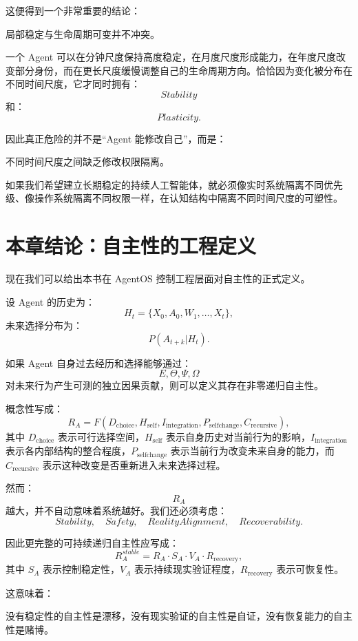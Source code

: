 这便得到一个非常重要的结论：

\begin{conclusion}
局部稳定与生命周期可变并不冲突。
\end{conclusion}

一个 Agent 可以在分钟尺度保持高度稳定，在月度尺度形成能力，在年度尺度改变部分身份，而在更长尺度缓慢调整自己的生命周期方向。恰恰因为变化被分布在不同时间尺度，它才同时拥有：
\[
Stability
\]
和：
\[
Plasticity.
\]

因此真正危险的并不是“Agent 能修改自己”，而是：
\begin{statementbox}
不同时间尺度之间缺乏修改权限隔离。
\end{statementbox}

如果我们希望建立长期稳定的持续人工智能体，就必须像实时系统隔离不同优先级、像操作系统隔离不同权限一样，在认知结构中隔离不同时间尺度的可塑性。

\section{本章结论：自主性的工程定义}

现在我们可以给出本书在 AgentOS 控制工程层面对自主性的正式定义。

设 Agent 的历史为：
\[
H_t
=
\{X_0,A_0,W_1,\ldots,X_t\},
\]
未来选择分布为：
\[
P(A_{t+k}|H_t).
\]

如果 Agent 自身过去经历和选择能够通过：
\[
E,\Theta,\Psi,\Omega
\]
对未来行为产生可测的独立因果贡献，则可以定义其存在非零递归自主性。

概念性写成：
\[
\boxed{
R_A
=
F(
D_{\mathrm{choice}},
H_{\mathrm{self}},
I_{\mathrm{integration}},
P_{\mathrm{selfchange}},
C_{\mathrm{recursive}}
),
}
\]
其中 $D_{\mathrm{choice}}$ 表示可行选择空间，$H_{\mathrm{self}}$ 表示自身历史对当前行为的影响，$I_{\mathrm{integration}}$ 表示各内部结构的整合程度，$P_{\mathrm{selfchange}}$ 表示当前行为改变未来自身的能力，而 $C_{\mathrm{recursive}}$ 表示这种改变是否重新进入未来选择过程。

然而：
\[
R_A
\]
越大，并不自动意味着系统越好。我们还必须考虑：
\[
Stability,
\quad
Safety,
\quad
RealityAlignment,
\quad
Recoverability.
\]

因此更完整的可持续递归自主性应写成：
\[
\boxed{
R_A^{stable}
=
R_A
\cdot
S_A
\cdot
V_A
\cdot
R_{\mathrm{recovery}},
}
\]
其中 $S_A$ 表示控制稳定性，$V_A$ 表示持续现实验证程度，$R_{\mathrm{recovery}}$ 表示可恢复性。

这意味着：

\begin{statementbox}
没有稳定性的自主性是漂移，没有现实验证的自主性是自证，没有恢复能力的自主性是赌博。
\end{statementbox}

